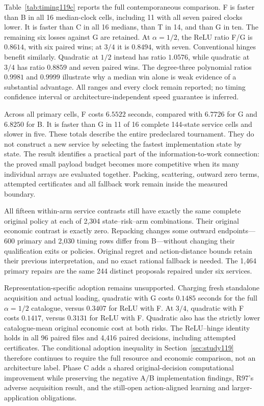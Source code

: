 Table~\ref{tab:timing119c} reports the full contemporaneous comparison.
F is faster than B in all 16 median-clock cells, including 11 with all
seven paired clocks lower.  It is faster than C in all 16 medians, than
T in 14, and than G in ten.  The remaining six losses against G are
retained.  At $\alpha=1/2$, the ReLU ratio F/G is $0.8614$, with six
paired wins; at $3/4$ it is $0.8494$, with seven.  Conventional hinges
benefit similarly.  Quadratic at $1/2$ instead has ratio $1.0576$,
while quadratic at $3/4$ has ratio $0.8859$ and seven paired wins.
The degree-three polynomial ratios $0.9981$ and $0.9999$ illustrate
why a median win alone is weak evidence of a substantial advantage.
All ranges and every clock remain reported; no timing confidence
interval or architecture-independent speed guarantee is inferred.

Across all primary cells, F costs $6.5522$ seconds, compared with
$6.7726$ for G and $6.8250$ for B.  It is faster than G in 11 of 16
complete 144-state service cells and slower in five.  These totals
describe the entire predeclared tournament.  They do not construct a
new service by selecting the fastest implementation state by state.
The result identifies a practical part of the information-to-work
connection: the proved small payload budget becomes more competitive
when its many individual arrays are evaluated together.  Packing,
scattering, outward zero terms, attempted certificates and all fallback
work remain inside the measured boundary.

All fifteen within-arm service contrasts still have exactly the same
complete original policy at each of 2,304 state--risk--arm combinations.
Their original economic contrast is exactly zero.  Repacking changes
some outward endpoints---600 primary and 2,030 timing rows differ from
B---without changing their qualification exits or policies.  Original
regret and action-distance bounds retain their previous interpretation,
and no exact rational fallback is needed.  The 1,464 primary repairs
are the same 244 distinct proposals repaired under six services.

Representation-specific adoption remains unsupported.  Charging fresh
standalone acquisition and actual loading, quadratic with G costs
$0.1485$ seconds for the full $\alpha=1/2$ catalogue, versus $0.3407$
for ReLU with F.  At $3/4$, quadratic with F costs $0.1417$, versus
$0.3131$ for ReLU with F.  Quadratic also has the strictly lower
catalogue-mean original economic cost at both risks.  The ReLU--hinge
identity holds in all 96 paired files and 4,416 paired decisions,
including attempted certificates.  The conditional adoption inequality
in Section~\ref{sec:study119} therefore continues to require the full
resource and economic comparison, not an architecture label.  Phase C
adds a shared original-decision computational improvement while
preserving the negative A/B implementation findings, R97's adverse
acquisition result, and the still-open action-aligned learning and
larger-application obligations.
